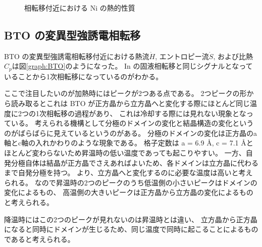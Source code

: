 \documentclass[9pt,dvipdfmx,a4paper]{jsarticle}
\begin{document}
\begin{figure}[hbt]
\begin{minipage}[t]{0.46\columnwidth}
        \label{graph:Ni-Cp}
    \end{minipage}
    \caption{相転移付近における Ni の熱的性質}
    \label{graph:Ni}
\end{figure}

\subsection{BTO の変異型強誘電相転移}
BTO の変異型強誘電相転移付近における熱流\(\dot{H}\), エントロピー流\(\dot{S}\), および比熱\(C_p\)は図\ref{graph:BTO}のようになった。
In の固液相転移と同じシグナルとなっていることから1次相転移になっているのがわかる。

ここで注目したいのが加熱時にはピークが2つある点である。
2つピークの形から読み取るとこれは BTO が正方晶から立方晶へと変化する際にほとんど同じ温度に2つの1次相転移の過程があり、
これは冷却する際には見れない現象となっている。
考えられる機構として分極のドメインの変化と結晶構造の変化というのがばらばらに見えているというのがある。
分極のドメインの変化は正方晶のa軸とc軸の入れかわりのような現象である。
格子定数は a = 6.9 \AA, c = 7.1 \AA とほとんど変わらないため昇温時の低い温度であっても起こりやすい。
一方、自発分極自体は結晶が正方晶でさえあればよいため、各ドメインは立方晶に代わるまで自発分極を持つ。
より、立方晶へと変化するのに必要な温度は高いと考えられる。
なので昇温時の2つのピークのうち低温側の小さいピークはドメインの変化によるもの、
高温側の大きいピークは正方晶から立方晶の変化によるものと考えられる。

降温時にはこの2つのピークが見れないのは昇温時とは違い、
立方晶から正方晶になると同時にドメインが生じるため、同じ温度で同時に起こることによるものであると考えられる。
\end{document}
